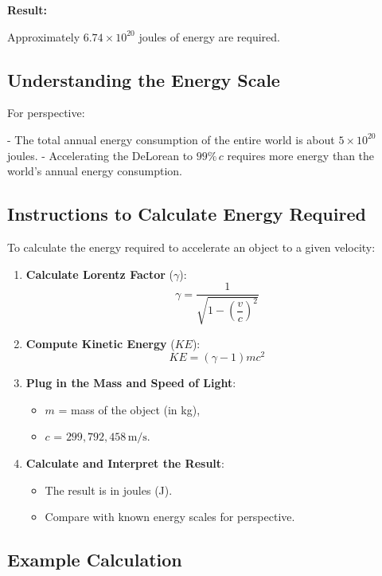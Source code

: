 \documentclass{article}
\begin{document}
\begin{multicols}{2}
\textbf{Result:}

Approximately \( 6.74 \times 10^{20} \) joules of energy are required.

\subsection*{Understanding the Energy Scale}

For perspective:

- The total annual energy consumption of the entire world is about \( 5 \times 10^{20} \) joules.
- Accelerating the DeLorean to \( 99\% \, c \) requires more energy than the world's annual energy consumption.

\subsection*{Instructions to Calculate Energy Required}

To calculate the energy required to accelerate an object to a given velocity:

\begin{enumerate}
    \item \textbf{Calculate Lorentz Factor} (\( \gamma \)):
    \[
    \gamma = \frac{1}{\sqrt{1 - \left( \dfrac{v}{c} \right)^2 }}
    \]
    \item \textbf{Compute Kinetic Energy} (\( KE \)):
    \[
    KE = (\gamma - 1) m c^2
    \]
    \item \textbf{Plug in the Mass and Speed of Light}:
    \begin{itemize}
        \item \( m \) = mass of the object (in kg),
        \item \( c \) = \( 299{,}792{,}458\, \text{m/s} \).
    \end{itemize}
    \item \textbf{Calculate and Interpret the Result}:
    \begin{itemize}
        \item The result is in joules (J).
        \item Compare with known energy scales for perspective.
    \end{itemize}
\end{enumerate}

\subsection*{Example Calculation}


\end{multicols}
\end{document}

